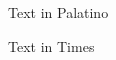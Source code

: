 \documentclass{article}
\begin{document}
Text in Palatino

{\selectfont 
Text in Times%
}
\end{document}
